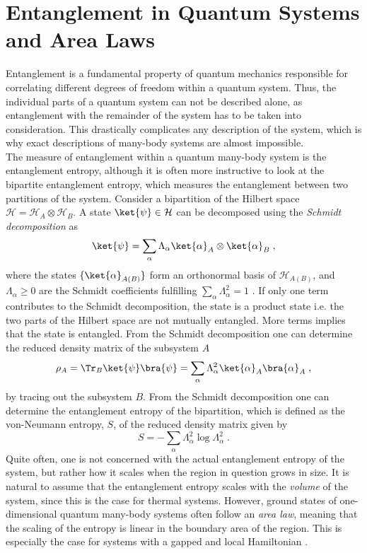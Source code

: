 \section{Entanglement in Quantum Systems and Area Laws}
Entanglement is a fundamental property of quantum mechanics responsible for correlating different degrees of freedom within a quantum system. Thus, the individual parts of a quantum system can not be described alone, as entanglement with the remainder of the system has to be taken into consideration. This drastically complicates any description of the system, which is why exact descriptions of many-body systems are almost impossible.\\
The measure of entanglement within a quantum many-body system is the entanglement entropy, although it is often more instructive to look at the bipartite entanglement entropy, which measures the entanglement between two partitions of the system.
Consider a bipartition of the Hilbert space $\mathcal{H} = \mathcal{H}_A \otimes \mathcal{H}_B$. A state $\ket{\psi} \in \mathcal{H}$ can be decomposed using the \textit{Schmidt decomposition} as
\begin{equation}
	\ket{\psi} = \sum_{\alpha} \Lambda_{\alpha} \ket{\alpha}_A \otimes \ket{\alpha}_B \; ,
\end{equation}
where the states $\{ \ket{\alpha}_{A(B)} \}$ form an orthonormal basis of $\mathcal{H}_{A(B)}$, and $\Lambda_{\alpha} \ge 0$ are the Schmidt coefficients fulfilling $\sum_{\alpha} \Lambda_{\alpha}^2 = 1$ \cite{Pathak2013}. If only one term contributes to the Schmidt decomposition, the state is a product state i.e. the two parts of the Hilbert space are not mutually entangled. More terms implies that the state is entangled. From the Schmidt decomposition one can determine the reduced density matrix of the subsystem $A$
\begin{equation}
	\rho_A = \Tr _B \ket{\psi}\bra{\psi} = \sum_{\alpha} \Lambda_{\alpha}^2 \ket{\alpha}_A \bra{\alpha}_A \; ,  
\end{equation}
by tracing out the subsystem $B$. 
From the Schmidt decomposition one can determine the entanglement entropy of the bipartition, which is defined as the von-Neumann entropy, $S$, of the reduced density matrix given by \cite{Pathak2013}
\begin{equation}
	S = - \sum_{\alpha} \Lambda_{\alpha}^2 \log \Lambda_{\alpha}^2 \; .
	\label{eq:vNEntropy}
\end{equation}
Quite often, one is not concerned with the actual entanglement entropy of the system, but rather how it scales when the region in question grows in size. It is natural to assume that the entanglement entropy scales with  the \textit{volume} of the system, since this is the case for thermal systems. However, ground states of one-dimensional quantum many-body systems often follow an \textit{area law}, meaning that the scaling of the entropy is linear in the boundary area of the region. This is especially the case for systems with a gapped and local Hamiltonian \cite{Cramer}.\\
